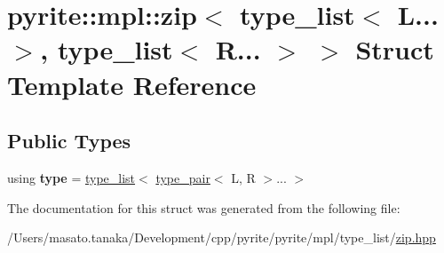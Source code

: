 \hypertarget{structpyrite_1_1mpl_1_1zip_3_01type__list_3_01_l_8_8_8_01_4_00_01type__list_3_01_r_8_8_8_01_4_01_4}{}\section{pyrite\+:\+:mpl\+:\+:zip$<$ type\+\_\+list$<$ L... $>$, type\+\_\+list$<$ R... $>$ $>$ Struct Template Reference}
\label{structpyrite_1_1mpl_1_1zip_3_01type__list_3_01_l_8_8_8_01_4_00_01type__list_3_01_r_8_8_8_01_4_01_4}
\subsection*{Public Types}
\begin{DoxyCompactItemize}
\item 
\mbox{\label{structpyrite_1_1mpl_1_1zip_3_01type__list_3_01_l_8_8_8_01_4_00_01type__list_3_01_r_8_8_8_01_4_01_4_a78da1b0b028f603038e6d67412e03c9a}} 
using {\bfseries type} = \mbox{\hyperlink{structpyrite_1_1core_1_1mpl_1_1type__list}{type\+\_\+list}}$<$ \mbox{\hyperlink{structpyrite_1_1mpl_1_1type__pair}{type\+\_\+pair}}$<$ L, R $>$... $>$
\end{DoxyCompactItemize}


The documentation for this struct was generated from the following file\+:\begin{DoxyCompactItemize}
\item 
/\+Users/masato.\+tanaka/\+Development/cpp/pyrite/pyrite/mpl/type\+\_\+list/\mbox{\hyperlink{zip_8hpp}{zip.\+hpp}}\end{DoxyCompactItemize}
